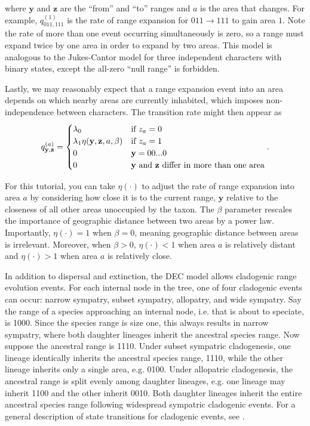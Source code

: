 where $\textbf{y}$ and $\textbf{z}$ are the ``from'' and ``to'' ranges and $a$ is the area that changes.
For example, $q^{(1)}_{011,111}$ is the rate of range expansion for $011 \rightarrow 111$ to gain area $1$.
Note the rate of more than one event occurring simultaneously is zero, so a range must expand twice by one area in order to expand by two areas.
This model is analogous to the Jukes-Cantor model for three independent characters with binary states, except the all-zero ``null range'' is forbidden.

Lastly, we may reasonably expect that a range expansion event into an area depends on which nearby areas are currently inhabited, which imposes non-independence between characters.
The transition rate might then appear as
\[
q^{(a)}_{\textbf{y},\textbf{z}} =
\begin{cases}
\lambda_0 & \text{if $z_a=0$}  \\
\lambda_1 \eta(\textbf{y}, \textbf{z}, a, \beta) & \text{if $z_a=1$} \\
0 & \mathbf{y} = 00...0 \\
0 & \text{\textbf{y} and \textbf{z} differ in more than one area}
\end{cases}.
\]

For this tutorial, you can take $\eta(\cdot)$ to adjust the rate of range expansion into area $a$ by considering how close it is to the current range, $\textbf{y}$ relative to the closeness of all other areas unoccupied by the taxon.
The $\beta$ parameter rescales the importance of geographic distance between two areas by a power law.
Importantly, $\eta(\cdot) = 1$ when $\beta=0$, meaning geographic distance between areas is irrelevant.
Moreover, when $\beta > 0$, $\eta(\cdot) < 1$ when area $a$ is relatively distant and $\eta(\cdot) > 1$ when area $a$ is relatively close.

In addition to dispersal and extinction, the DEC model allows cladogenic range evolution events.
For each internal node in the tree, one of four cladogenic events can occur: narrow sympatry, subset sympatry, allopatry, and wide sympatry.
Say the range of a species approaching an internal node, i.e. that is about to speciate, is 1000.
Since the species range is size one, this always results in narrow sympatry, where both daughter lineages inherit the ancestral species range.
Now suppose the ancestral range is 1110.
Under subset sympatric cladogenesis, one lineage identically inherits the ancestral species range, 1110, while the other lineage inherits only a single area, e.g. 0100.
Under allopatric cladogenesis, the ancestral range is split evenly among daughter lineages, e.g. one lineage may inherit 1100 and the other inherit 0010.
Both daughter lineages inherit the entire ancestral species range following widespread sympatric cladogenic events.
For a general description of state transitions for cladogenic events, see \citet{matzke13}.

